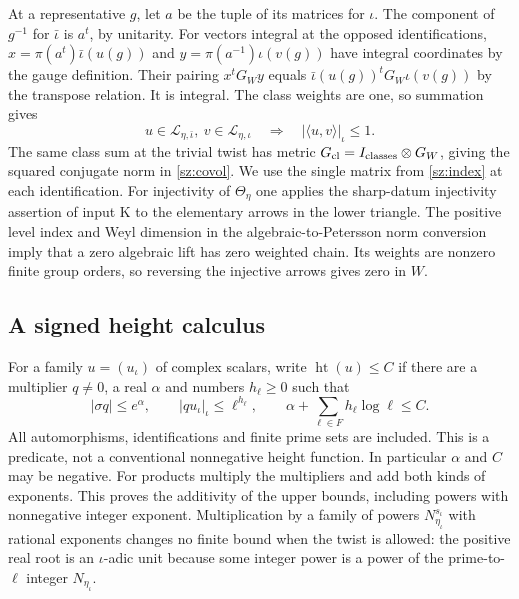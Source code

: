 At a representative $g$, let $a$ be the tuple of its matrices for
$\iota$. The component of $g^{-1}$ for $\bar\iota$ is $a^t$, by
unitarity. For vectors integral at the opposed identifications,
$x=\pi(a^t)\bar\iota(u(g))$ and
$y=\pi(a^{-1})\iota(v(g))$ have integral coordinates by the gauge
definition. Their pairing $x^tG_W y$ equals
$\bar\iota(u(g))^tG_W\iota(v(g))$ by the transpose relation.
It is integral. The class weights are one, so summation gives
\begin{equation}\label{c3:local-pair}
 u\in\mathcal L_{\eta,\bar\iota},\ v\in\mathcal L_{\eta,\iota}
 \quad\Longrightarrow\quad
 |\langle u,v\rangle|_\iota\le1.
\end{equation}
The same class sum at the trivial twist has metric
$G_{\rm cl}=I_{\rm classes}\otimes G_W$, giving the squared conjugate norm
in \eqref{sz:covol}. We use the single matrix from \eqref{sz:index}
at each identification. For injectivity of $\Theta_\eta$ one applies
the sharp-datum injectivity assertion of input K to the elementary
arrows in the lower triangle. The positive level index and Weyl
dimension in the algebraic-to-Petersson norm conversion imply that
a zero algebraic lift has zero weighted chain. Its weights are
nonzero finite group orders, so reversing the injective arrows gives
zero in $W$.

\subsection{A signed height calculus}\label{c3:height}

For a family $u=(u_\iota)$ of complex scalars, write
$\operatorname{ht}(u)\le C$ if there are a multiplier $q\ne0$,
a real $\alpha$ and numbers $h_\ell\ge0$ such that
\begin{equation}\label{c3:heightdef}
 |\sigma q|\le e^\alpha,\qquad |qu_\iota|_\iota\le
 \ell^{h_\ell},\qquad
 \alpha+\sum_{\ell\in F}h_\ell\log\ell\le C.
\end{equation}
All automorphisms, identifications and finite prime sets are included.
This is a predicate, not a conventional nonnegative height function.
In particular $\alpha$ and $C$ may be negative. For products multiply
the multipliers and add both kinds of exponents. This proves the
additivity of the upper bounds, including powers with nonnegative
integer exponent. Multiplication by a family of powers
$N_{\eta_\iota}^{s_\iota}$ with rational exponents changes no finite
bound when the twist is allowed: the positive real root is an
$\iota$-adic unit because some integer power is a power of the
prime-to-$\ell$ integer $N_{\eta_\iota}$.

